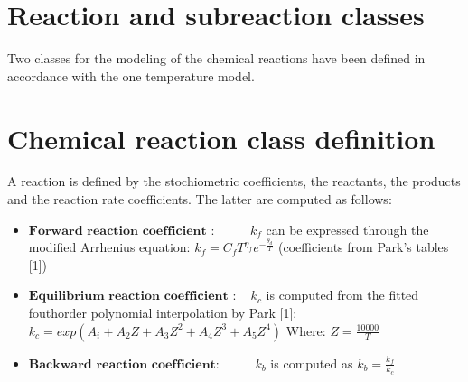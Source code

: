 \documentclass[letterpaper,10pt,english]{jupyterBook}
\begin{document}
\chapter{Reaction and sub\sphinxhyphen{}reaction classes}
\label{\detokenize{2_Temperature/_2T_Reaction_class_definition:reaction-and-sub-reaction-classes}}\label{\detokenize{2_Temperature/_2T_Reaction_class_definition::doc}}
\sphinxAtStartPar
Two classes for the modeling of the chemical reactions have been defined in accordance with the one temperature model.


\chapter{Chemical reaction class definition}
\label{\detokenize{2_Temperature/_2T_Reaction_class_definition:chemical-reaction-class-definition}}
\sphinxAtStartPar
A reaction is defined by the stochiometric coefficients, the reactants, the products and the reaction rate coefficients. The latter are computed as follows:
\begin{itemize}
\item {} 
\sphinxAtStartPar
\(\textbf{Forward reaction coefficient}\) :       \(k_f\) can be expressed through the modified Arrhenius equation: \(k_f = C_f T ^{\eta_f}e^{-\frac{\theta_d}{T}}\)  (coefficients from Park’s tables {[}1{]})

\item {} 
\sphinxAtStartPar
\(\textbf{Equilibrium reaction coefficient}\) :   \(k_c\) is computed from the fitted fouth\sphinxhyphen{}order polynomial interpolation by Park {[}1{]}: \(k_c = exp(A_i + A_2Z + A_3Z^2 + A_4Z^3 + A_5Z^4)\) 
Where: \(Z = \frac{10000}{T}\)

\item {} 
\sphinxAtStartPar
\(\textbf{Backward reaction coefficient}\):       \(k_b\) is computed as \(k_b = \frac{k_f}{k_c}\)


\end{itemize}
\end{document}
